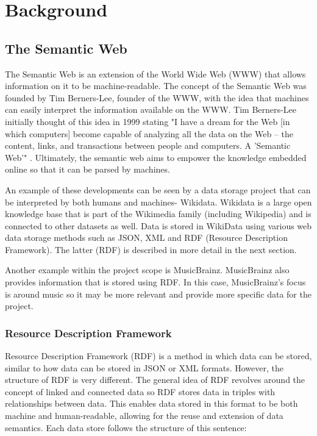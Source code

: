 \usetikzlibrary {arrows}
\usetikzlibrary {shapes.geometric}
\usetikzlibrary {patterns}

\chapter{Background}

\section{The Semantic Web}
\hspace*{0.5cm} The Semantic Web is an extension of the World Wide Web (WWW) that allows information on it to be machine-readable. \cite{semanticweb} The concept of the Semantic Web was founded by Tim Berners-Lee, founder of the WWW, with the idea that machines can easily interpret the information available on the WWW. Tim Berners-Lee initially thought of this idea in 1999 stating "I have a dream for the Web [in which computers] become capable of analyzing all the data on the Web – the content, links, and transactions between people and computers. A 'Semantic Web'" \cite{TBLBook}. Ultimately, the semantic web aims to empower the knowledge embedded online so that it can be parsed by machines. \cite{semanticweb} 

An example of these developments can be seen by a data storage project that can be interpreted by both humans and machines- Wikidata. Wikidata is a large open knowledge base that is part of the Wikimedia family (including Wikipedia) and is connected to other datasets as well. \cite{wikidata} Data is stored in WikiData using various web data storage methods such as JSON, XML and RDF (Resource Description Framework). The latter (RDF) is described in more detail in the next section.  

Another example within the project scope is MusicBrainz. MusicBrainz also provides information that is stored using RDF. \cite{musicbrainz} In this case, MusicBrainz's focus is around music so it may be more relevant and provide more specific data for the project.  

\subsection{Resource Description Framework}
\hspace*{0.5cm} Resource Description Framework (RDF) is a method in which data can be stored, similar to how data can be stored in JSON or XML formats. However, the structure of RDF is very different. The general idea of RDF revolves around the concept of linked and connected data so RDF stores data in triples with relationships between data. This enables data stored in this format to be both machine and human-readable, allowing for the reuse and extension of data semantics. \cite{rdf} Each data store follows the structure of this sentence: 

